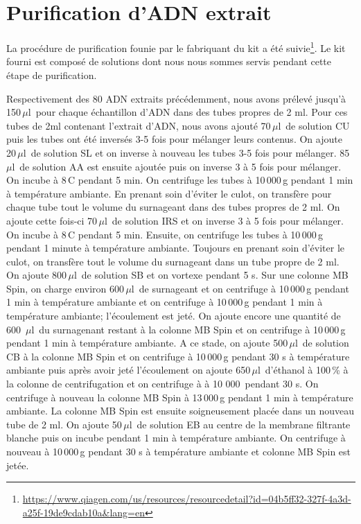 \documentclass[a4paper,11pt]{article}
\begin{document}
\section{Purification d'ADN extrait}

La procédure de purification founie par le fabriquant du kit a été
suivie\footnote{\url{https://www.qiagen.com/us/resources/resourcedetail?id=04b5ff32-327f-4a3d-a25f-19de9cdab10a&lang=en}}.
Le kit fourni est composé de solutions dont nous nous sommes servis
pendant cette étape de purification.

Respectivement des 80 ADN extraits précédemment, nous avons prélevé
jusqu'à 150\,$\mu$l\, pour chaque échantillon d'ADN dans des tubes
propres de 2 ml. Pour ces tubes de 2ml contenant l'extrait d'ADN, nous
avons ajouté 70\,$\mu$l\, de solution CU puis les tubes ont été
inversés 3-5 fois pour mélanger leurs contenus. On ajoute 20\,$\mu$l\,
de solution SL et on inverse à nouveau les tubes 3-5 fois pour
mélanger.  85\,$\mu$l\, de solution AA est ensuite ajoutée puis on
inverse 3 à 5 fois pour mélanger. On incube à 8\,\degree{}C pendant 5
min.  On centrifuge les tubes à 10\,000\,g pendant 1 min à température
ambiante. En prenant soin d'éviter le culot, on transfère pour chaque
tube tout le volume du surnageant dans des tubes propres de 2 ml. On
ajoute cette fois-ci 70\,$\mu$l\, de solution IRS et on inverse 3 à 5
fois pour mélanger. On incube à 8\,\degree{}C pendant 5 min.  Ensuite,
on centrifuge les tubes à 10\,000\,g pendant 1 minute à température
ambiante. Toujours en prenant soin d'éviter le culot, on transfère
tout le volume du surnageant dans un tube propre de 2 ml. On ajoute
800\,$\mu$l\, de solution SB et on vortexe pendant 5 s. Sur une
colonne MB Spin, on charge environ 600\,$\mu$l\, de surnageant et on
centrifuge à 10\,000\,g pendant 1 min à température ambiante et on
centrifuge à 10\,000\,g pendant 1 min à température ambiante;
l'écoulement est jeté.  On ajoute encore une quantité de 600
\,$\mu$l\, du surnagenant restant à la colonne MB Spin et on
centrifuge à 10\,000\,g pendant 1 min à température ambiante.  A ce
stade, on ajoute 500\,$\mu$l\, de solution CB à la colonne MB Spin et
on centrifuge à 10\,000\,g pendant 30 s à température ambiante puis
après avoir jeté l'écoulement on ajoute 650\,$\mu$l\, d'éthanol à
100\,\% à la colonne de centrifugation et on centrifuge à à 10 000\,
pendant 30 s. On centrifuge à nouveau la colonne MB Spin à 13\,000\,g
pendant 1 min à température ambiante.  La colonne MB Spin est ensuite
soigneusement placée dans un nouveau tube de 2 ml. On ajoute
50\,$\mu$l\, de solution EB au centre de la membrane filtrante blanche
puis on incube pendant 1 min à température ambiante. On centrifuge à
nouveau à 10\,000\,g pendant 30 s à température ambiante et colonne MB
Spin est jetée.
\end{document}

